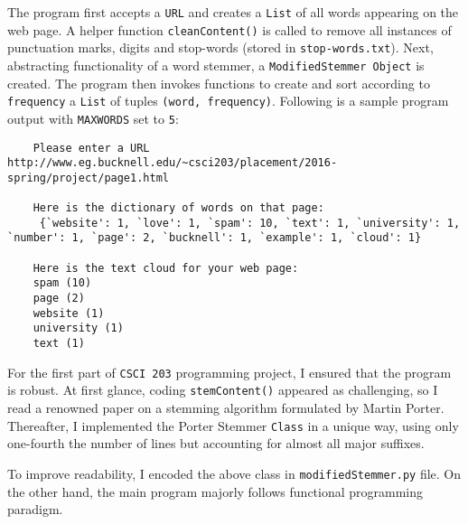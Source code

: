 \documentclass[12pt,letterpaper]{article}
\begin{document}
\date{}
\maketitle
\vspace{-12mm}

\thispagestyle{fancy}

The program first accepts a \texttt{URL} and creates a \texttt{List} of all words appearing on the web page. A helper function \texttt{cleanContent()} is called to remove all instances of punctuation marks, digits and stop-words (stored in \texttt{stop-words.txt}). Next, abstracting functionality of a word stemmer, a \texttt{ModifiedStemmer Object} is created. The program then invokes functions to create and sort according to \texttt{frequency} a \texttt{List} of tuples \texttt{(word, frequency)}. Following is a sample program output with \texttt{MAX\textunderscore WORDS} set to \texttt{5}:

\begin{lstlisting}
    Please enter a URL http://www.eg.bucknell.edu/~csci203/placement/2016-spring/project/page1.html
    
    Here is the dictionary of words on that page: 
     {`website': 1, `love': 1, `spam': 10, `text': 1, `university': 1, `number': 1, `page': 2, `bucknell': 1, `example': 1, `cloud': 1}
    
    Here is the text cloud for your web page: 
    spam (10) 
    page (2) 
    website (1) 
    university (1) 
    text (1) 
\end{lstlisting}

For the first part of \texttt{CSCI 203} programming project, I ensured that the program is robust. At first glance, coding \texttt{stemContent()} appeared as challenging, so I read a renowned paper on a stemming algorithm formulated by Martin Porter. Thereafter, I implemented the Porter Stemmer \texttt{Class} in a unique way, using only one-fourth the number of lines but accounting for almost all major suffixes.

To improve readability, I encoded the above class in \texttt{modifiedStemmer.py} file. On the other hand, the main program majorly follows functional programming paradigm.
\end{document}
